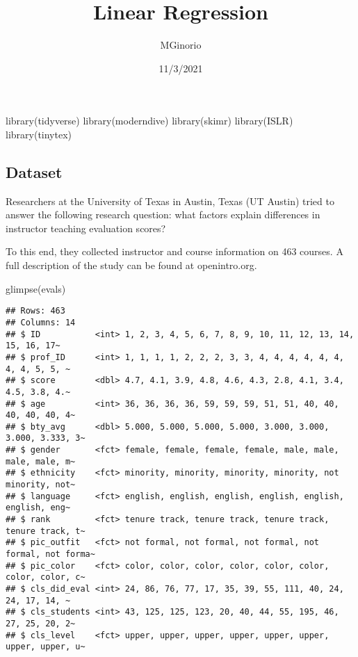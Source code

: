 \documentclass[
]{article}
\title{Linear Regression}
\author{MGinorio}
\date{11/3/2021}
\newenvironment{Shaded}{\begin{snugshade}}{\end{snugshade}}
\newcommand{\FunctionTok}[1]{\textcolor[rgb]{0.00,0.00,0.00}{#1}}
\newcommand{\NormalTok}[1]{#1}
\begin{document}
\maketitle

\begin{Shaded}
\begin{Highlighting}[]
\FunctionTok{library}\NormalTok{(tidyverse)}
\FunctionTok{library}\NormalTok{(moderndive)}
\FunctionTok{library}\NormalTok{(skimr)}
\FunctionTok{library}\NormalTok{(ISLR)}
\FunctionTok{library}\NormalTok{(tinytex)}
\end{Highlighting}
\end{Shaded}

\hypertarget{dataset}{%
\subsection{Dataset}\label{dataset}}

Researchers at the University of Texas in Austin, Texas (UT Austin)
tried to answer the following research question: what factors explain
differences in instructor teaching evaluation scores?

To this end, they collected instructor and course information on 463
courses. A full description of the study can be found at openintro.org.

\begin{Shaded}
\begin{Highlighting}[]
\FunctionTok{glimpse}\NormalTok{(evals)}
\end{Highlighting}
\end{Shaded}

\begin{verbatim}
## Rows: 463
## Columns: 14
## $ ID           <int> 1, 2, 3, 4, 5, 6, 7, 8, 9, 10, 11, 12, 13, 14, 15, 16, 17~
## $ prof_ID      <int> 1, 1, 1, 1, 2, 2, 2, 3, 3, 4, 4, 4, 4, 4, 4, 4, 4, 5, 5, ~
## $ score        <dbl> 4.7, 4.1, 3.9, 4.8, 4.6, 4.3, 2.8, 4.1, 3.4, 4.5, 3.8, 4.~
## $ age          <int> 36, 36, 36, 36, 59, 59, 59, 51, 51, 40, 40, 40, 40, 40, 4~
## $ bty_avg      <dbl> 5.000, 5.000, 5.000, 5.000, 3.000, 3.000, 3.000, 3.333, 3~
## $ gender       <fct> female, female, female, female, male, male, male, male, m~
## $ ethnicity    <fct> minority, minority, minority, minority, not minority, not~
## $ language     <fct> english, english, english, english, english, english, eng~
## $ rank         <fct> tenure track, tenure track, tenure track, tenure track, t~
## $ pic_outfit   <fct> not formal, not formal, not formal, not formal, not forma~
## $ pic_color    <fct> color, color, color, color, color, color, color, color, c~
## $ cls_did_eval <int> 24, 86, 76, 77, 17, 35, 39, 55, 111, 40, 24, 24, 17, 14, ~
## $ cls_students <int> 43, 125, 125, 123, 20, 40, 44, 55, 195, 46, 27, 25, 20, 2~
## $ cls_level    <fct> upper, upper, upper, upper, upper, upper, upper, upper, u~
\end{verbatim}
\end{document}
